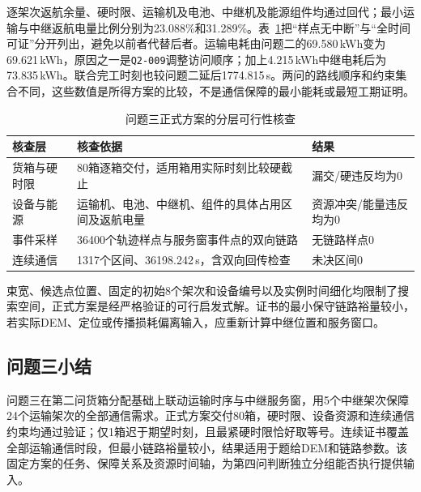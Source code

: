 逐架次返航余量、硬时限、运输机及电池、中继机及能源组件均通过回代；最小运输与中继返航电量比例分别为23.088\%和31.289\%。表~\ref{tab:q3-verification}把“样点无中断”与“全时间可证”分开列出，避免以前者代替后者。运输电耗由问题二的69.580\,kWh变为69.621\,kWh，原因之一是\texttt{Q2-009}调整访问顺序；加上4.215\,kWh中继电耗后为73.835\,kWh。联合完工时刻也较问题二延后1774.815\,s。两问的路线顺序和约束集合不同，这些数值是所得方案的比较，不是通信保障的最小能耗或最短工期证明。
\begin{table}[htbp]
\centering\small
\caption{问题三正式方案的分层可行性核查}
\label{tab:q3-verification}
\begin{tabular}{@{}p{}p{}p{}@{}}
\toprule
核查层 & 核查依据 & 结果\\
\midrule
货箱与硬时限 & 80箱逐箱交付，适用箱用实际时刻比较硬截止 & 漏交/硬违反均为0\\
设备与能源 & 运输机、电池、中继机、组件的具体占用区间及返航电量 & 资源冲突/能量违反均为0\\
事件采样 & 36400个轨迹样点与服务窗事件点的双向链路 & 无链路样点0\\
连续通信 & 1317个区间、36198.242\,s，含双向回传检查 & 未决区间0\\
\bottomrule
\end{tabular}
\end{table}

束宽、候选点位置、固定的初始8个架次和设备编号以及实例时间细化均限制了搜索空间，正式方案是经严格验证的可行启发式解。证书的最小保守链路裕量较小，若实际DEM、定位或传播损耗偏离输入，应重新计算中继位置和服务窗口。

\subsection{问题三小结}
问题三在第二问货箱分配基础上联动运输时序与中继服务窗，用5个中继架次保障24个运输架次的全部通信需求。正式方案交付80箱，硬时限、设备资源和连续通信约束均通过验证；仅1箱迟于期望时刻，且最紧硬时限恰好取等号。连续证书覆盖全部运输通信时段，但最小链路裕量较小，结果适用于题给DEM和链路参数。该固定方案的任务、保障关系及资源时间轴，为第四问判断独立分组能否执行提供输入。

